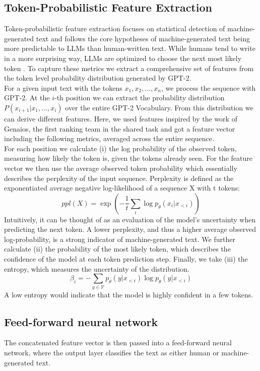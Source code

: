 \documentclass[11pt]{article}
\begin{document}
\subsection{Token-Probabilistic Feature Extraction}
Token-probabilistic feature extraction focuses on statistical detection of machine-generated text and follows the core 
hypotheses of machine-generated text being more predictable to LLMs than human-written text. While humans tend to write in a more 
surprising way, LLMs are optimized to choose the next most likely token \cite{holtzman2019curious}. 
To capture these metrics we extract a comprehensive set of features from the token level probability distribution 
generated by GPT-2.\\ 
For a given input text with the tokens \(x_1, x_2,\dots, x_n\), we process the sequence with GPT-2. At the
\(i\)-th position we can extract the probability distribution \(P(x_{i+1} | x_1, \dots, x_i)\) over the entire GPT-2 
Vocabulary. From this distribution we can derive different features. Here, we used features inspired by the work of 
Genaios, the first ranking team in the shared task and got a feature vector including the following metrics, averaged 
across the entire sequence.\\
For each position we calculate (i) the log probability of the observed token, measuring how likely the token is, 
given the tokens already seen. For the feature vector we then use the average observed token probability which 
essentially describes the perplexity of the input sequence. Perplexity is defined as the exponentiated average negative 
log-likelihood of a sequence X with t tokens: 
\[
    ppl(X) = \exp \left( -\frac{1}{t} \sum_{i} \log p_{\theta} (x_i|x_{<i})\right)
\]
Intuitively, it can be thought of as an evaluation of the model’s uncertainty when predicting
the next token. A lower perplexity, and thus a higher average observed 
log-probability, is a strong indicator of machine-generated text. 
We further calculate (ii) the probability of the most likely token, which describes the confidence of the model at each token prediction
step. 
Finally, we take (iii) the entropy, which measures the uncertainty of the distribution. 
\[ \beta_i = - \sum_{y \in \mathcal{V}} p_\theta(y | x_{<i}) \log p_\theta(y | x_{<i})
\] A low entropy would indicate that 
the model is highly confident in a few tokens.  

\subsection{Feed-forward neural network}
The concatenated feature vector is then passed into a feed-forward neural network, where the output layer classifies the text 
as either human or machine-generated text. 
\end{document}
